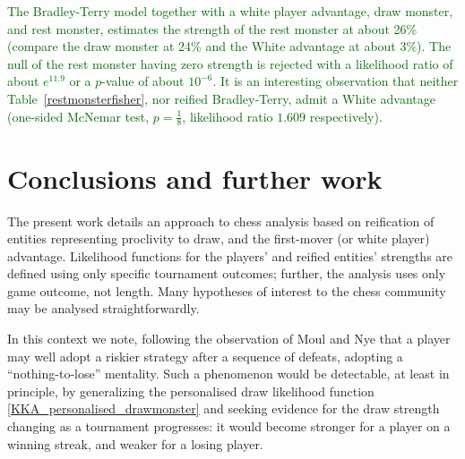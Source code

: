 \documentclass[review]{elsarticle}
\begin{document}
\begin{table}
\textcolor{DarkGreen}{
  \caption{Results for won games in Cura\c{c}ao 1962  between
      rested and unrested players    \label{restmonsterfisher}}
  \centering
  }
\end{table}

\textcolor{DarkGreen}{The Bradley-Terry model together with a white
  player advantage, draw monster, and rest monster, estimates the
  strength of the rest monster at about 26\% (compare the draw monster
  at 24\% and the White advantage at about 3\%).  The null of the rest
  monster having zero strength is rejected with a likelihood ratio of
  about $e^{11.9}$ or a $p$-value of about $10^{-6}$.  It is an
  interesting observation that neither Table~\ref{restmonsterfisher},
  nor reified Bradley-Terry, admit a White advantage (one-sided
  McNemar test, $p=\frac{1}{8}$, likelihood ratio $1.609$
  respectively).  }

\section{Conclusions and further work}

The present work details an approach to chess analysis based on
reification of entities representing proclivity to draw, and the
first-mover (or white player) advantage.  Likelihood functions for the
players' and reified entities' strengths are defined using only
specific tournament outcomes; further, the analysis uses only game
outcome, not length.  Many hypotheses of interest to the chess
community may be analysed straightforwardly.

In this context we note, following the observation of Moul and Nye
that a player may well adopt a riskier strategy after a sequence of
defeats, adopting a ``nothing-to-lose'' mentality.  Such a phenomenon
would be detectable, at least in principle, by generalizing the
personalised draw likelihood function
\ref{KKA_personalised_drawmonster} and seeking evidence for the draw
strength changing as a tournament progresses: it would become stronger
for a player on a winning streak, and weaker for a losing player.
\end{document}
